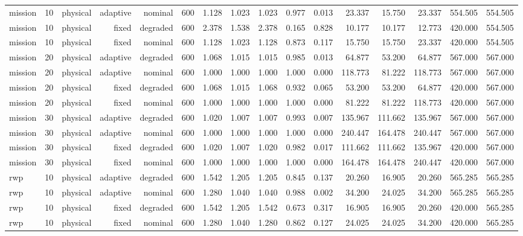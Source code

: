 \begin{tabular}{lrrrrrrrrrrrrrrr}
mission & 10 & physical & adaptive & nominal & 600 & 1.128 & 1.023 & 1.023 & 0.977 & 0.013 & 23.337 & 15.750 & 23.337 & 554.505 & 554.505 \\
mission & 10 & physical & fixed & degraded & 600 & 2.378 & 1.538 & 2.378 & 0.165 & 0.828 & 10.177 & 10.177 & 12.773 & 420.000 & 554.505 \\
mission & 10 & physical & fixed & nominal & 600 & 1.128 & 1.023 & 1.128 & 0.873 & 0.117 & 15.750 & 15.750 & 23.337 & 420.000 & 554.505 \\
mission & 20 & physical & adaptive & degraded & 600 & 1.068 & 1.015 & 1.015 & 0.985 & 0.013 & 64.877 & 53.200 & 64.877 & 567.000 & 567.000 \\
mission & 20 & physical & adaptive & nominal & 600 & 1.000 & 1.000 & 1.000 & 1.000 & 0.000 & 118.773 & 81.222 & 118.773 & 567.000 & 567.000 \\
mission & 20 & physical & fixed & degraded & 600 & 1.068 & 1.015 & 1.068 & 0.932 & 0.065 & 53.200 & 53.200 & 64.877 & 420.000 & 567.000 \\
mission & 20 & physical & fixed & nominal & 600 & 1.000 & 1.000 & 1.000 & 1.000 & 0.000 & 81.222 & 81.222 & 118.773 & 420.000 & 567.000 \\
mission & 30 & physical & adaptive & degraded & 600 & 1.020 & 1.007 & 1.007 & 0.993 & 0.007 & 135.967 & 111.662 & 135.967 & 567.000 & 567.000 \\
mission & 30 & physical & adaptive & nominal & 600 & 1.000 & 1.000 & 1.000 & 1.000 & 0.000 & 240.447 & 164.478 & 240.447 & 567.000 & 567.000 \\
mission & 30 & physical & fixed & degraded & 600 & 1.020 & 1.007 & 1.020 & 0.982 & 0.017 & 111.662 & 111.662 & 135.967 & 420.000 & 567.000 \\
mission & 30 & physical & fixed & nominal & 600 & 1.000 & 1.000 & 1.000 & 1.000 & 0.000 & 164.478 & 164.478 & 240.447 & 420.000 & 567.000 \\
rwp & 10 & physical & adaptive & degraded & 600 & 1.542 & 1.205 & 1.205 & 0.845 & 0.137 & 20.260 & 16.905 & 20.260 & 565.285 & 565.285 \\
rwp & 10 & physical & adaptive & nominal & 600 & 1.280 & 1.040 & 1.040 & 0.988 & 0.002 & 34.200 & 24.025 & 34.200 & 565.285 & 565.285 \\
rwp & 10 & physical & fixed & degraded & 600 & 1.542 & 1.205 & 1.542 & 0.673 & 0.317 & 16.905 & 16.905 & 20.260 & 420.000 & 565.285 \\
rwp & 10 & physical & fixed & nominal & 600 & 1.280 & 1.040 & 1.280 & 0.862 & 0.127 & 24.025 & 24.025 & 34.200 & 420.000 & 565.285 \\

\end{tabular}
